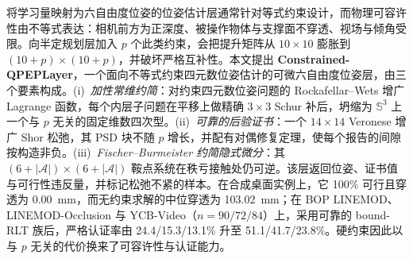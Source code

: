 将学习量映射为六自由度位姿的位姿估计层通常针对等式约束设计，而物理可容许性由不等式表达：相机前方为正深度、被操作物体与支撑面不穿透、视场与倾角受限。向半定规划层加入 $p$ 个此类约束，会把提升矩阵从 $10\times10$ 膨胀到 $(10+p)\times(10+p)$，并破坏严格互补性。本文提出 \textbf{Constrained-QPEPLayer}，一个面向不等式约束四元数位姿估计的可微六自由度位姿层，由三个要素构成。(i)~\emph{加性常维约简}：对约束四元数位姿问题的 Rockafellar--Wets 增广 Lagrange 函数，每个内层子问题在平移上做精确 $3\times3$ Schur 补后，坍缩为 $\mathbb{S}^3$ 上一个与 $p$ 无关的固定维数四次型。(ii)~\emph{可靠的后验证书}：一个 $14\times14$ Veronese 增广 Shor 松弛，其 PSD 块不随 $p$ 增长，并配有对偶修复定理，使每个报告的间隙按构造非负。(iii)~\emph{Fischer--Burmeister 约简隐式微分}：其 $(6+|\mathcal A|)\times(6+|\mathcal A|)$ 鞍点系统在秩亏接触处仍可逆。该层返回位姿、证书值与可行性违反量，并标记松弛不紧的样本。在合成桌面实例上，它 100\% 可行且穿透为 0.00~mm，而无约束求解的中位穿透为 103.02~mm；在 BOP LINEMOD、LINEMOD-Occlusion 与 YCB-Video（$n=90/72/84$）上，采用可靠的 bound-RLT 族后，严格认证率由 24.4/15.3/13.1\% 升至 51.1/41.7/23.8\%。硬约束因此以与 $p$ 无关的代价换来了可容许性与认证能力。
